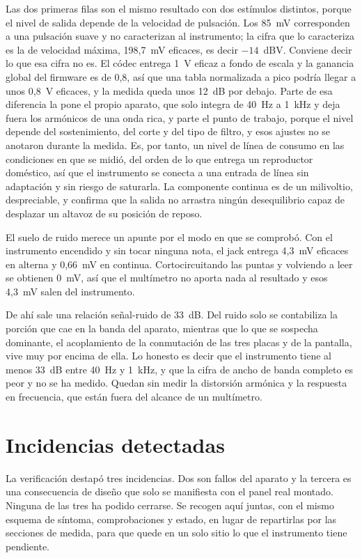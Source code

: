 Las dos primeras filas son el mismo resultado con dos estímulos distintos,
porque el nivel de salida depende de la velocidad de pulsación. Los 85~mV
corresponden a una pulsación suave y no caracterizan al instrumento; la cifra
que lo caracteriza es la de velocidad máxima, 198,7~mV eficaces, es decir
$-14$~dBV. Conviene decir lo que esa cifra no es. El códec entrega 1~V eficaz a
fondo de escala \cite{DaisySeed} y la ganancia global del firmware es de 0,8,
así que una tabla normalizada a pico podría llegar a unos 0,8~V eficaces, y la
medida queda unos 12~dB por debajo. Parte de esa diferencia la pone el propio
aparato, que solo integra de 40~Hz a 1~kHz y deja fuera los armónicos de una
onda rica, y parte el punto de trabajo, porque el nivel depende del
sostenimiento, del corte y del tipo de filtro, y esos ajustes no se anotaron
durante la medida. Es, por tanto, un nivel de línea de consumo en las
condiciones en que se midió, del orden de lo que entrega un reproductor
doméstico, así que el instrumento se conecta a una entrada de línea sin
adaptación y sin riesgo de saturarla. La componente continua es de un
milivoltio, despreciable, y confirma que la salida no arrastra ningún
desequilibrio capaz de desplazar un altavoz de su posición de reposo.

El suelo de ruido merece un apunte por el modo en que se comprobó. Con el
instrumento encendido y sin tocar ninguna nota, el jack entrega 4,3~mV eficaces
en alterna y 0,66~mV en continua. Cortocircuitando las puntas y volviendo a
leer se obtienen 0~mV, así que el multímetro no aporta nada al resultado y esos
4,3~mV salen del instrumento.

De ahí sale una relación señal-ruido de 33~dB. Del ruido solo se contabiliza la
porción que cae en la banda del aparato, mientras que lo que se sospecha
dominante, el acoplamiento de la conmutación de las tres placas y de la
pantalla, vive muy por encima de ella. Lo honesto es decir que el instrumento
tiene al menos 33~dB entre 40~Hz y 1~kHz, y que la cifra de ancho de banda
completo es peor y no se ha medido. Quedan sin medir la distorsión armónica y
la respuesta en frecuencia, que están fuera del alcance de un multímetro.

\section{Incidencias detectadas}
\label{sec:incidencias}

La verificación destapó tres incidencias. Dos son fallos del aparato y la
tercera es una consecuencia de diseño que solo se manifiesta con el panel real
montado. Ninguna de las tres ha podido cerrarse. Se recogen aquí juntas, con el
mismo esquema de síntoma, comprobaciones y estado, en lugar de repartirlas por
las secciones de medida, para que quede en un solo sitio lo que el instrumento
tiene pendiente.

